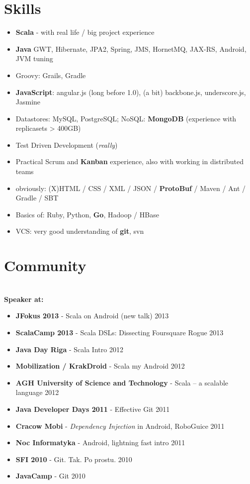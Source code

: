 \documentclass{res}
\begin{document}
\begin{resume}
\section{Skills}
\begin{itemize}
 \item \textbf{Scala} - with real life / big project experience
 \item \textbf{Java} GWT, Hibernate, JPA2, Spring, JMS, HornetMQ, JAX-RS, Android, JVM tuning
 \item Groovy: Grails, Gradle
 \item \textbf{JavaScript}: angular.js (long before 1.0), (a bit) backbone.js, underscore.js, Jasmine
 \item Datastores: MySQL, PostgreSQL; NoSQL: \textbf{MongoDB} (experience with replicasets > 400GB)
 \item Test Driven Development (\textit{really})
 \item Practical Scrum and \textbf{Kanban} experience, also with working in distributed teams
 \item obviously: (X)HTML / CSS / XML / JSON / \textbf{ProtoBuf} / Maven / Ant / Gradle / SBT
 \item Basics of: Ruby, Python, \textbf{Go}, Hadoop / HBase
 \item VCS: very good understanding of \textbf{git}, svn
\end{itemize}

\section{Community}
\\ 
\textbf{Speaker at:}
\begin{itemize}
 \item \textbf{JFokus 2013} - Scala on Android (new talk)    \hfill 2013
 \item \textbf{ScalaCamp 2013} - Scala DSLs: Dissecting Foursquare Rogue    \hfill 2013
 \item\textbf{Java Day Riga} - Scala Intro \hfill 2012
 \item \textbf{Mobilization / KrakDroid} - Scala my Android    \hfill 2012
 \item \textbf{AGH University of Science and Technology} - Scala -- a scalable language    \hfill 2012
 \item \textbf{Java Developer Days 2011} - Effective Git    \hfill 2011
 \item \textbf{Cracow Mobi} - \textit{Dependency Injection} in Android, RoboGuice    \hfill 2011
 \item \textbf{Noc Informatyka} - Android, lightning fast intro    \hfill 2011
 \item \textbf{SFI 2010} - Git. Tak. Po prostu.    \hfill 2010
 \item \textbf{JavaCamp} - Git    \hfill 2010
\end{itemize}



\end{resume}
\end{document}
